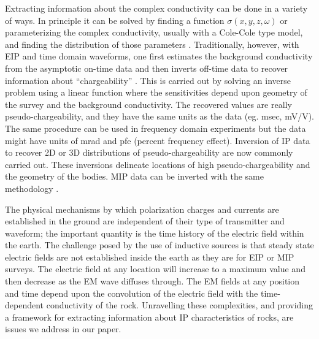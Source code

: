 \documentclass[extra,mreferee]{gji}
\begin{document}
Extracting information about the complex conductivity can be done in a variety of ways. In principle it can be solved by finding a function $\sigma(x,y,z,\omega)$ or parameterizing the complex conductivity, usually with a Cole-Cole type model, and finding the distribution of those parameters \cite[]{Yuval1997,Hordt2006}. Traditionally, however, with EIP and time domain waveforms, one first estimates the background conductivity from the asymptotic on-time data and then inverts off-time data to recover information about ``chargeability'' \cite[]{doug1994}. This is carried out by solving an inverse problem using a linear function where the sensitivities depend upon geometry of the survey and the background conductivity. The recovered values are really pseudo-chargeability, and they have the same units as the data (eg. msec, mV/V). The same procedure can be used in frequency domain experiments but the data might have units of mrad and pfe (percent frequency effect). Inversion of IP data to recover 2D or 3D distributions of pseudo-chargeability are now commonly carried out. These inversions delineate locations of high pseudo-chargeability and the geometry of the bodies. MIP data can be inverted with the same methodology \cite[]{Chen2003}. 

The physical mechanisms by which polarization charges and currents are established in the ground are independent of their type of transmitter and waveform; the important quantity is the time history of the electric field within the earth. The challenge posed by the use of  inductive sources is that steady state electric fields are not established inside the earth as they are for EIP or MIP surveys. The electric field at any location will increase to a maximum value and then decrease as the EM wave diffuses through. The EM fields at any position and time depend upon the convolution of the electric field with the time-dependent conductivity of the rock. Unravelling these complexities, and providing a framework for extracting information about IP characteristics of rocks, are issues we address in our paper. 
\end{document}
